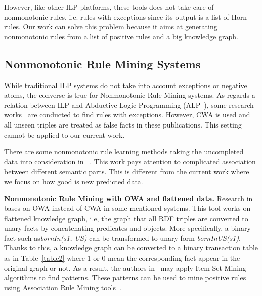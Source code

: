 However, like other ILP platforms, these tools does not take care of nonmonotonic rules, i.e. rules with exceptions since its output is a list of Horn rules. Our work can solve this problem because it aims at generating nonmonotonic rules from a list of positive rules and a big knowledge graph.

\subsection{Nonmonotonic Rule Mining Systems}
\label{related-work-nonmonotonic-rule-mining-systems}

While traditional ILP systems do not take into account exceptions or negative atoms, the converse is true for Nonmonotonic Rule Mining systems. As regards a relation between ILP and Abductive Logic Programming (ALP~\cite{ref31}), some research works~\cite{ref11, ref32, ref33} are conducted to find rules with exceptions. However, CWA is used and all unseen triples are treated as false facts in these publications. This setting cannot be applied to our current work.

There are some nonmonotonic rule learning methods taking the uncompleted data into consideration in ~\cite{ref34}. This work pays attention to complicated association between different semantic parts. This is different from the current work where we focus on how good is new predicted data.

\textbf{Nonmonotonic Rule Mining with OWA and flattened data.} Research in ~\cite{ref12} bases on OWA instead of CWA in some mentioned systems. This tool works on flattened knowledge graph, i.e, the graph that all RDF triples are converted to unary facts by concatenating predicates and objects. More specifically, a binary fact such as\textit{bornIn(s1, US)} can be transformed to unary form \textit{bornInUS(s1)}. Thanks to this, a knowledge graph can be converted to a binary transaction table as in Table~\ref{table2} where 1 or 0 mean the corresponding fact appear in the original graph or not. As a result, the authors in~\cite{ref12} may apply Item Set Mining algorithms to find patterns. These patterns can be used to mine positive rules using Association Rule Mining tools~\cite{ref13}.

